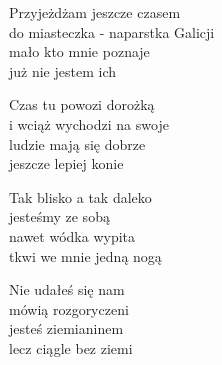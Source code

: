 \begin{text}
    Przyjeżdżam jeszcze czasem\\
    do miasteczka - naparstka Galicji\\
    mało kto mnie poznaje\\
    już nie jestem ich

    Czas tu powozi dorożką\\
    i wciąż wychodzi na swoje\\
    ludzie mają się dobrze\\
    jeszcze lepiej konie

    Tak blisko a tak daleko\\
    jesteśmy ze sobą\\
    nawet wódka wypita\\
    tkwi we mnie jedną nogą

    Nie udałeś się nam\\
    mówią rozgoryczeni\\
    jesteś ziemianinem\\
    lecz ciągle bez ziemi
\end{text}
\begin{chord}

\end{chord}